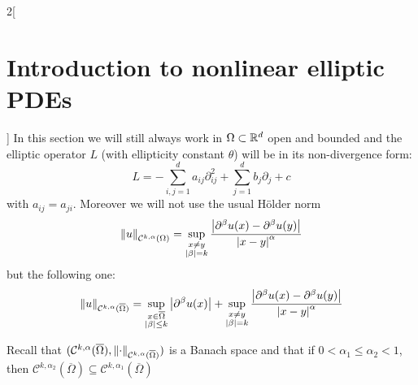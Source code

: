 \documentclass[../../../main_math.tex]{subfiles}
\begin{document}
\begin{multicols}{2}[\section{Introduction to nonlinear elliptic PDEs}]
  In this section we will still always work in $\Omega\subset\mathbb{R}^d$ open and bounded and the elliptic operator $L$ (with ellipticity constant $\theta$) will be in its non-divergence form:
  $$
    L=-\sum_{i,j=1}^d a_{ij}\partial_{ij}^2+\sum_{j=1}^d b_j\partial_j+c
  $$
  with $a_{ij}=a_{ji}$.  Moreover we will not use the usual Hölder norm
  $$
    \left\|u\right\|_{\mathcal{C}^{k,\alpha}(\Omega)}=\sup_{\substack{x\ne y\\ \abs{\beta}=k}}\frac{\abs{\partial^\beta u(x)-\partial^\beta u(y)}}{\abs{x-y}^\alpha}
  $$
  but the following one:
  $$
    \left\|u\right\|_{\mathcal{C}^{k,\alpha}(\overline\Omega)}=\sup_{\substack{x\in \overline\Omega\\ \abs{\beta}\leq k}}\abs{\partial^\beta u(x)}+\sup_{\substack{x\ne y\\ \abs{\beta}=k}}\frac{\abs{\partial^\beta u(x)-\partial^\beta u(y)}}{\abs{x-y}^\alpha}
  $$

  \begin{remark}
    Recall that $(\mathcal{C}^{k,\alpha}(\overline\Omega),\left\|\cdot\right\|_{\mathcal{C}^{k,\alpha}(\overline\Omega)})$ is a Banach space and that if $0<\alpha_1\leq\alpha_2<1$, then $
      \mathcal{C}^{k,\alpha_2}(\overline{\Omega})\subseteq \mathcal{C}^{k,\alpha_1}(\overline{\Omega})$
  \end{remark}


\end{multicols}
\end{document}
